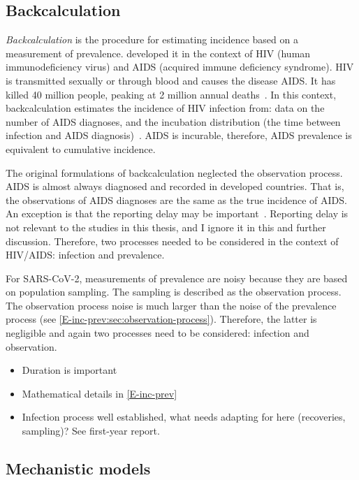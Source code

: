 \documentclass[thesis.tex]{subfiles}
\begin{document}
\subsection{Backcalculation}

\emph{Backcalculation} is the procedure for estimating incidence based on a measurement of prevalence.
\Textcite{brookmeyerMethod} developed it in the context of HIV (human immunodeficiency virus) and AIDS (acquired immune deficiency syndrome).
HIV is transmitted sexually or through blood and causes the disease AIDS.
It has killed 40 million people, peaking at 2 million annual deaths~\autocite{unaids2023}.
In this context, backcalculation estimates the incidence of HIV infection from: data on the number of AIDS diagnoses, and the incubation distribution (the time between infection and AIDS diagnosis)~\autocite{brookmeyerBackcalculation,brookmeyerMeasuring}.
AIDS is incurable, therefore, AIDS prevalence is equivalent to cumulative incidence.


The original formulations of backcalculation neglected the observation process.
AIDS is almost always diagnosed and recorded in developed countries.
That is, the observations of AIDS diagnoses are the same as the true incidence of AIDS.
An exception is that the reporting delay may be important~\autocite{paganoHIV}.
Reporting delay is not relevant to the studies in this thesis, and I ignore it in this and further discussion.
Therefore, two processes needed to be considered in the context of HIV/AIDS: infection and prevalence.

For SARS-CoV-2, measurements of prevalence are noisy because they are based on population sampling.
The sampling is described as the observation process.
The observation process noise is much larger than the noise of the prevalence process (see \cref{E-inc-prev:sec:observation-process}).
Therefore, the latter is negligible and again two processes need to be considered: infection and observation.

\begin{itemize}
    \item Duration is important
    \item Mathematical details in \cref{E-inc-prev}
    \item Infection process well established, what needs adapting for here (recoveries, sampling)? See first-year report.
\end{itemize}

\subsection{Mechanistic models}
\end{document}
